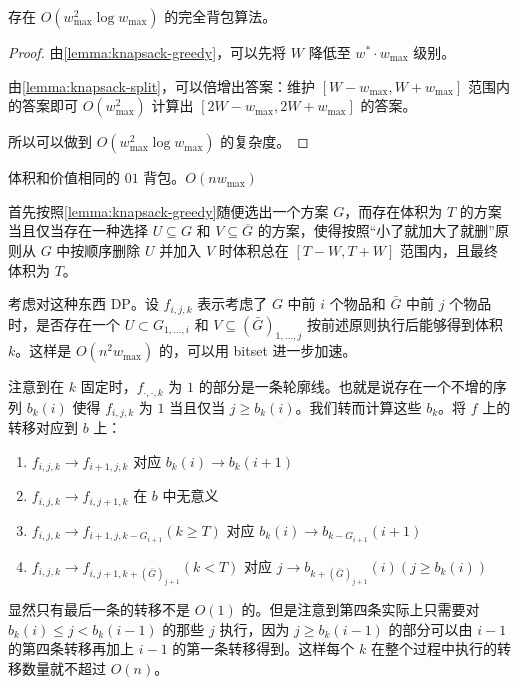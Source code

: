 \begin{corollary}
    存在 $O(w_{\max}^2\log w_{\max})$ 的完全背包算法。
\end{corollary}
\begin{proof}
    由\cref{lemma:knapsack-greedy}，可以先将 $W$ 降低至 $w^*\cdot w_{\max}$ 级别。

    由\cref{lemma:knapsack-split}，可以倍增出答案：维护 $[W-w_{\max}, W+w_{\max}]$ 范围内的答案即可 $O(w_{\max}^2)$ 计算出 $[2W-w_{\max},2W+w_{\max}]$ 的答案。

    所以可以做到 $O(w_{\max}^2\log w_{\max})$ 的复杂度。
\end{proof}

\begin{example}
   体积和价值相同的 $01$ 背包。$O(nw_{\max})$ 
\end{example}
\begin{solution}
    首先按照\cref{lemma:knapsack-greedy}随便选出一个方案 $G$，而存在体积为 $T$ 的方案当且仅当存在一种选择 $U\subseteq G$ 和 $V\subseteq \overline G$ 的方案，使得按照“小了就加大了就删”原则从 $G$ 中按顺序删除 $U$ 并加入 $V$ 时体积总在 $[T-W,T+W]$ 范围内，且最终体积为 $T$。

    考虑对这种东西 DP。设 $f_{i,j,k}$ 表示考虑了 $G$ 中前 $i$ 个物品和 $\bar G$ 中前 $j$ 个物品时，是否存在一个 $U\subset G_{1,\ldots,i}$ 和 $V\subseteq (\bar G)_{1,\ldots,j}$ 按前述原则执行后能够得到体积 $k$。这样是 $O(n^2w_{\max})$ 的，可以用 bitset 进一步加速。
    
    注意到在 $k$ 固定时，$f_{\cdot,\cdot,k}$ 为 $1$ 的部分是一条轮廓线。也就是说存在一个不增的序列 $b_k(i)$ 使得 $f_{i,j,k}$ 为 $1$ 当且仅当 $j\ge b_k(i)$。我们转而计算这些 $b_k$。将 $f$ 上的转移对应到 $b$ 上：
    \begin{enumerate}
        \item $f_{i,j,k}\to f_{i+1,j,k}$ 对应 $b_k(i)\to b_k(i+1)$
        \item $f_{i,j,k}\to f_{i,j+1,k}$ 在 $b$ 中无意义
        \item $f_{i,j,k}\to f_{i+1,j,k-G_{i+1}}(k\ge T)$ 对应 $b_k(i)\to b_{k-G_{i+1}}(i+1)$
        \item $f_{i,j,k}\to f_{i,j+1,k+(\bar G)_{j+1}}(k<T)$ 对应 $j\to b_{k+(\bar G)_{j+1}}(i)(j\ge b_k(i))$
    \end{enumerate}
    显然只有最后一条的转移不是 $O(1)$ 的。但是注意到第四条实际上只需要对 $b_k(i)\le j<b_k(i-1)$ 的那些 $j$ 执行，因为 $j\ge b_k(i-1)$ 的部分可以由 $i-1$ 的第四条转移再加上 $i-1$ 的第一条转移得到。这样每个 $k$ 在整个过程中执行的转移数量就不超过 $O(n)$。
\end{solution}

